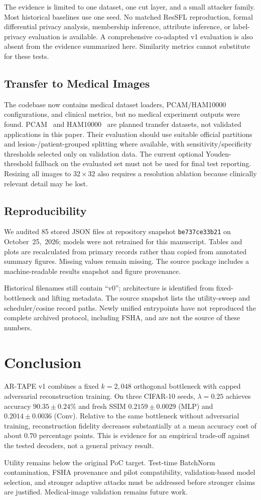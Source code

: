 The evidence is limited to one dataset, one cut layer, and a small attacker family. Most historical baselines use one seed. No matched ResSFL reproduction, formal differential privacy analysis, membership inference, attribute inference, or label-privacy evaluation is available. A comprehensive co-adapted v1 evaluation is also absent from the evidence summarized here. Similarity metrics cannot substitute for these tests.

\subsection{Transfer to Medical Images}
The codebase now contains medical dataset loaders, PCAM/HAM10000 configurations, and clinical metrics, but no medical experiment outputs were found. PCAM~\cite{veeling2018pcam} and HAM10000~\cite{tschandl2018ham} are planned transfer datasets, not validated applications in this paper. Their evaluation should use suitable official partitions and lesion-/patient-grouped splitting where available, with sensitivity/specificity thresholds selected only on validation data. The current optional Youden-threshold fallback on the evaluated set must not be used for final test reporting. Resizing all images to $32\times32$ also requires a resolution ablation because clinically relevant detail may be lost.

\subsection{Reproducibility}
We audited 85 stored JSON files at repository snapshot \texttt{be737ce33b21} on October~25,~2026; models were not retrained for this manuscript. Tables and plots are recalculated from primary records rather than copied from annotated summary figures. Missing values remain missing. The source package includes a machine-readable results snapshot and figure provenance.

Historical filenames still contain ``v0''; architecture is identified from fixed-bottleneck and lifting metadata. The source snapshot lists the utility-sweep and scheduler/cosine record paths. Newly unified entrypoints have not reproduced the complete archived protocol, including FSHA, and are not the source of these numbers.

\section{Conclusion}
AR-TAPE v1 combines a fixed $k=2{,}048$ orthogonal bottleneck with capped adversarial reconstruction training. On three CIFAR-10 seeds, $\lambda=0.25$ achieves accuracy $90.35\pm0.24\%$ and fresh SSIM $0.2159\pm0.0029$ (MLP) and $0.2014\pm0.0036$ (Conv). Relative to the same bottleneck without adversarial training, reconstruction fidelity decreases substantially at a mean accuracy cost of about $0.70$ percentage points. This is evidence for an empirical trade-off against the tested decoders, not a general privacy result.

Utility remains below the original PoC target. Test-time BatchNorm contamination, FSHA provenance and pilot compatibility, validation-based model selection, and stronger adaptive attacks must be addressed before stronger claims are justified. Medical-image validation remains future work.
